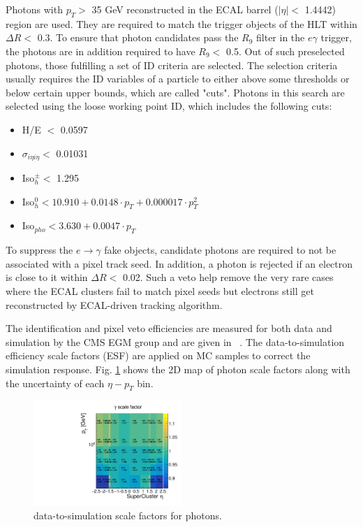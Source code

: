 \documentclass[thesis.tex]{subfiles}
\renewcommand\_{\textunderscore\allowbreak}
\begin{document}
Photons with $p_{T} >$ 35 GeV reconstructed in the ECAL barrel ($|\eta| <$ 1.4442) region are used. 
They are required to match the trigger objects of the HLT within $\Delta R <$ 0.3. 
To ensure that photon candidates pass the $R_9$ filter in the $e\gamma$ trigger, the photons are in addition required to have $R_9 <$ 0.5.
Out of such preselected photons, those fulfilling a set of ID criteria are selected.
The selection criteria usually requires the ID variables of a particle to either above some thresholds or below certain upper bounds, which are called "cuts". 
Photons in this search are selected using the loose working point ID, which includes the following cuts: 
\begin{center}
\begin{itemize}
\item H/E $<$ 0.0597
\item $\sigma_{i\eta i\eta} <$ 0.01031 
\item Iso$_h^\pm <$ 1.295
\item Iso$_h^0 < 10.910 +0.0148 \cdot p_{T} + 0.000017 \cdot p^2_{T}$
\item Iso$_{pho} < 3.630+0.0047 \cdot p_{T}$
\end{itemize}
\end{center}

To suppress the $e\rightarrow\gamma$ fake objects, candidate photons are required to not be associated with a pixel track seed. 
In addition, a photon is rejected if an electron is close to it within $\Delta R <$ 0.02. 
Such a veto help remove the very rare cases where the ECAL clusters fail to match pixel seeds but electrons still get reconstructed by ECAL-driven tracking algorithm.

The identification and pixel veto efficiencies are measured for both data and simulation by the CMS EGM group and are given in ~\cite{EGM:leptonScale}. The data-to-simulation efficiency scale factors (ESF) are applied on MC samples to correct the simulation response. Fig. \ref{fig:photonsf} shows the 2D map of photon scale factors along with the uncertainty of each $\eta-p_T$ bin.

\begin{figure}[hbtp]
	\centering
	\includegraphics[width=0.5\textwidth]{plot/SF_Photon.pdf}
	\caption{data-to-simulation scale factors for photons.}
	\label{fig:photonsf}
\end{figure}
\end{document}
